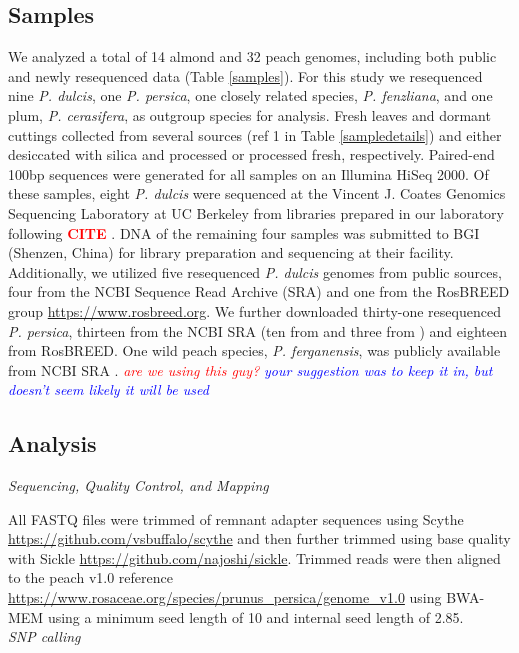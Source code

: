 \documentclass[12pt]{article}
\newcommand{\citex}{\textcolor{red}{\bf CITE }}
\newcommand{\jri}[1]{\textcolor{red}{\emph{#1}}}
\newcommand{\dv}[1]{\textcolor{blue}{\emph{#1}}}
\begin{document}
\subsection*{Samples}
We analyzed a total of 14 almond and 32 peach genomes, including both public and newly resequenced data (Table \ref{samples}). 
%
For this study we resequenced nine \emph{P. dulcis}, one \emph{P. persica}, one closely related species, \emph{P. fenzliana}, and one plum, \emph{P. cerasifera}, as outgroup species for analysis.
%
Fresh leaves and dormant cuttings collected from several sources (ref 1 in Table \ref{sampledetails}) and either desiccated with silica and processed or processed fresh, respectively. 
%
Paired-end 100bp sequences were generated for all samples on an Illumina HiSeq 2000. 
%
Of these samples, eight \emph{P. dulcis} were sequenced at the Vincent J. Coates Genomics Sequencing Laboratory at UC Berkeley from libraries prepared in our laboratory following \citex. 
DNA of the remaining four samples was submitted to BGI (Shenzen, China) for library preparation and sequencing at their facility.
%
%
Additionally, we utilized five resequenced \emph{P. dulcis} genomes from public sources, four from \citealt{koepke2013comparative} 
the NCBI Sequence Read Archive (SRA) and one from the RosBREED group \url{https://www.rosbreed.org}.
%
We further downloaded thirty-one resequenced \emph{P. persica}, thirteen from the NCBI SRA (ten from \citealt{verde2013high} and three from \citealt{ahmad2011whole}) and eighteen from RosBREED.
%
One wild peach species, \emph{P. ferganensis}, was publicly available from NCBI SRA \citep{verde2013high}. \jri{are we using this guy?} \dv{your suggestion was to keep it in, but doesn't seem likely it will be used}
%
\subsection*{Analysis}
\emph{Sequencing, Quality Control, and Mapping}

%
All FASTQ files were trimmed of remnant adapter sequences using Scythe \url{https://github.com/vsbuffalo/scythe} and then further trimmed using base quality with Sickle \url{https://github.com/najoshi/sickle}. 
%
Trimmed reads were then aligned to the peach v1.0 reference \url{https://www.rosaceae.org/species/prunus_persica/genome_v1.0} using BWA-MEM  \citep{li2013aligning} using a minimum seed length of 10 and internal seed length of 2.85.
%
\\
\emph{SNP calling}
\end{document}
